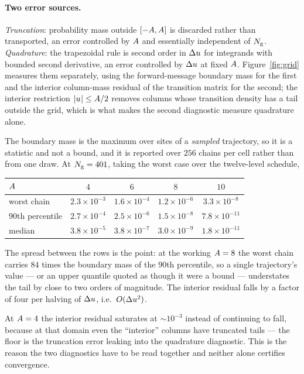\paragraph{Two error sources.} \emph{Truncation}: probability mass outside
$[-A,A]$ is discarded rather than transported, an error controlled by
$A$ and essentially independent of $N_{\mathrm{g}}$. \emph{Quadrature}: the trapezoidal rule is
second order in $\Delta u$ for integrands with bounded second derivative, an error controlled by
$\Delta u$ at fixed $A$. Figure~\ref{fig:grid} measures them separately, using the
forward-message boundary mass for the first and the interior column-mass residual of the
transition matrix for the second; the interior restriction $|u_{}| \le A/2$ removes
columns whose transition density has a tail outside the grid, which is what makes the second
diagnostic measure quadrature alone.

The boundary mass is the maximum over sites of a \emph{sampled} trajectory, so it is a statistic
and not a bound, and it is reported over $256$ chains per cell rather than from one draw. At
$N_{\mathrm{g}}=401$, taking the worst case over the twelve-level schedule,

\begin{center}\small
\begin{tabular}{@{}lcccc@{}}
\toprule
$A$ & $4$ & $6$ & $8$ & $10$ \\
\midrule
worst chain & $2.3\times10^{-3}$ & $1.6\times10^{-4}$ & $1.2\times10^{-6}$ & $3.3\times10^{-8}$ \\
$90$th percentile & $2.7\times10^{-4}$ & $2.5\times10^{-6}$ & $1.5\times10^{-8}$ & $7.8\times10^{-11}$ \\
median & $3.8\times10^{-5}$ & $3.8\times10^{-7}$ & $3.0\times10^{-9}$ & $1.8\times10^{-11}$ \\
\bottomrule
\end{tabular}
\end{center}

\noindent
The spread between the rows is the point: at the working $A=8$ the worst chain carries
$84$ times the boundary mass of the $90$th percentile, so a single trajectory's value --- or an
upper quantile quoted as though it were a bound --- understates the tail by close to two orders of
magnitude. The interior residual falls by a factor of four per halving of $\Delta u$, i.e.\
$O(\Delta u^2)$.

At $A=4$ the interior residual saturates at $\sim10^{-3}$ instead of continuing to fall,
because at that domain even the ``interior'' columns have truncated tails --- the floor is the
truncation error leaking into the quadrature diagnostic. This is the reason the two diagnostics
have to be read together and neither alone certifies convergence.

